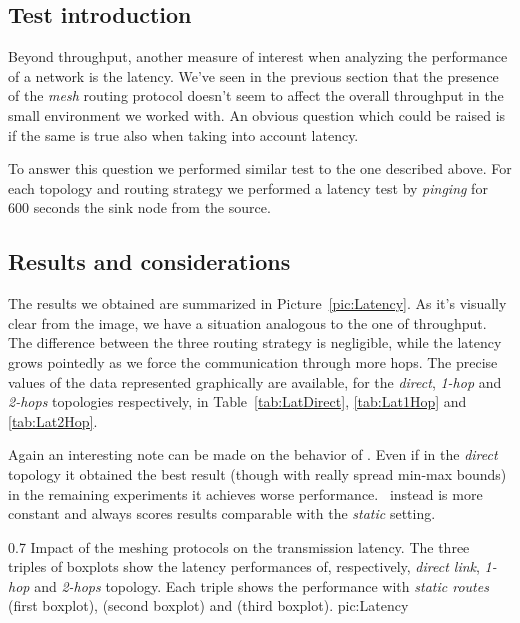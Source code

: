 \subsection{Test introduction}
    Beyond throughput, another measure of interest when analyzing the
    performance of a network is the latency. We've seen in the
    previous section that the presence of the \emph{mesh} routing
    protocol doesn't seem to affect the overall throughput in the small
    environment we worked with. An obvious question which could be
    raised is if the same is true also when taking into account latency.

    To answer this question we performed similar test to the one
    described above. For each topology and routing strategy we
    performed a latency test by \emph{pinging} for 600 seconds the sink
    node from the source.

\subsection{Results and considerations}

    The results we obtained are summarized in
    Picture~\ref{pic:Latency}. As it's visually clear from the image, we
    have a situation analogous to the one of throughput. The difference
    between the three routing strategy is negligible, while the latency
    grows pointedly as we force the communication through more hops.
    The precise values of the data represented graphically are available,
    for the \emph{direct}, \emph{1-hop} and \emph{2-hops} topologies
    respectively, in Table~\ref{tab:LatDirect}, \ref{tab:Lat1Hop} and
    \ref{tab:Lat2Hop}.

    Again an interesting note can be made on the behavior of \olsr. Even
    if in the \emph{direct} topology it obtained the best result (though
    with really spread min-max bounds) in the remaining experiments it
    achieves worse performance. \batman\ instead is more constant and
    always scores results comparable with the \emph{static} setting.

        {0.7 \columnwidth}
        {Impact of the meshing protocols on the transmission latency. The
         three triples of boxplots show the latency performances of,
         respectively, \emph{direct link}, \emph{1-hop} and \emph{2-hops}
         topology. Each triple shows the performance with \emph{static
         routes} (first boxplot), \emph{\batman} (second boxplot) and
         \emph{\olsr} (third boxplot).}
        {pic:Latency}


